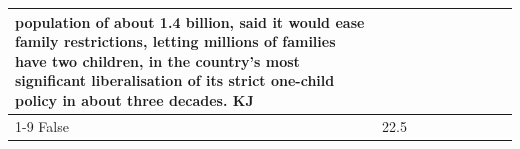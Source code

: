 \begin{table}[H]
\begin{tabular}{lllrlllll}
population of about 1.4 billion, said it would ease family restrictions, letting millions of families have two children, in the country's most significant liberalisation of its strict one-child policy in about three decades. KJ \\
\cline{1-9}
False & 22.5%
\end{tabular}
\end{table}
